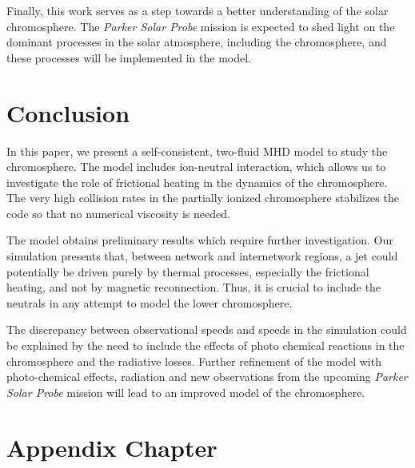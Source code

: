 \documentclass[12pt,upcase]{umlthesis}
\begin{document}
Finally, this work serves as a step towards a better understanding of the solar chromosphere. The {\it Parker Solar Probe\/} mission \citep{SolarProbe16} is expected to shed light on the dominant processes in the solar atmosphere, including the chromosphere, and these processes will be implemented in the model. 

\chapter{Conclusion}\label{chap:conclusion}

In this paper, we present a self-consistent, two-fluid MHD model to study the chromosphere. The model includes ion-neutral interaction, which allows us to investigate the role of frictional heating in the dynamics of the chromosphere.  The very high collision rates in the partially ionized chromosphere stabilizes the code so that no numerical viscosity is needed.  

The model obtains preliminary results which require further investigation. Our simulation presents that, between network and internetwork regions, a jet could potentially be driven purely by thermal processes, especially the frictional heating, and not by magnetic reconnection. Thus, it is crucial to include the neutrals in any attempt to model the lower chromosphere.

The discrepancy between observational speeds and speeds in the simulation could be explained by the need to include the effects of photo chemical reactions in the chromosphere and the radiative losses. Further refinement of the model with photo-chemical effects, radiation and new observations from the upcoming {\it Parker Solar Probe\/} mission will lead to an improved model of the chromosphere.  

\nocite{*}



\appendix
\chapter{Appendix Chapter}
\end{document}
